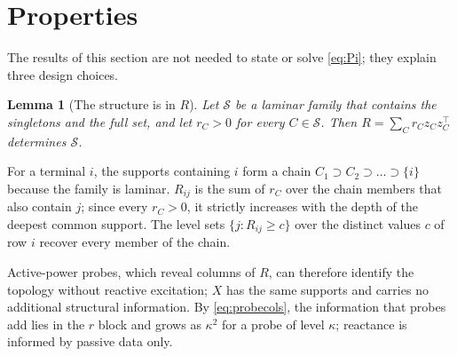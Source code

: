 \documentclass[journal,onecolumn,11pt]{IEEEtran}
\newtheorem{lemma}{Lemma}
\newcommand{\tp}{^{\top}}
\begin{document}
\section{Properties}
The results of this section are not needed to state or solve \eqref{eq:Pi}; they explain three design choices.

\begin{lemma}[The structure is in $R$]\label{lem:R}
Let $\mathcal S$ be a laminar family that contains the singletons and the full set, and let $r_C>0$ for every $C\in\mathcal S$. Then $R=\sum_Cr_Cz_Cz_C\tp$ determines $\mathcal S$.
\end{lemma}
\begin{IEEEproof}
For a terminal $i$, the supports containing $i$ form a chain $C_1\supset C_2\supset\dots\supset\{i\}$ because the family is laminar. $R_{ij}$ is the sum of $r_C$ over the chain members that also contain $j$; since every $r_C>0$, it strictly increases with the depth of the deepest common support. The level sets $\{j:R_{ij}\ge c\}$ over the distinct values $c$ of row $i$ recover every member of the chain.
\end{IEEEproof}
Active-power probes, which reveal columns of $R$, can therefore identify the topology without reactive excitation; $X$ has the same supports and carries no additional structural information. By \eqref{eq:probecols}, the information that probes add lies in the $r$ block and grows as $\kappa^2$ for a probe of level $\kappa$; reactance is informed by passive data only.
\end{document}
